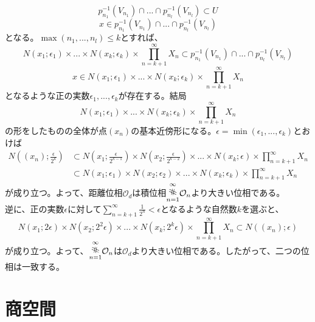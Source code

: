 \documentclass{jsarticle}
\begin{document}
\[p_{n_1}^{-1}(V_{n_1})\cap...\cap p_{n_l}^{-1}(V_{n_l})\subset U\]
\[x\in p_{n_1}^{-1}(V_{n_1})\cap...\cap p_{n_l}^{-1}(V_{n_l})\]
となる。$\max(n_1,...,n_l)\leq k$とすれば、
\[N(x_1;\epsilon_1)\times...\times N(x_k;\epsilon_k)\times\prod_{n=k+1}^{\infty}X_n\subset p_{n_1}^{-1}(V_{n_1})\cap...\cap p_{n_l}^{-1}(V_{n_l})\]
\[x\in N(x_1;\epsilon_1)\times...\times N(x_k;\epsilon_k)\times\prod_{n=k+1}^{\infty}X_n\]
となるような正の実数$\epsilon_1,...,\epsilon_k$が存在する。結局
\[N(x_1;\epsilon_1)\times...\times N(x_k;\epsilon_k)\times\prod_{n=k+1}^{\infty}X_n\]
の形をしたものの全体が点$(x_n)$の基本近傍形になる。$\epsilon=\min(\epsilon_1,...,\epsilon_k)$とおけば
\begin{align*}
N((x_n);\frac{\epsilon}{2^k})&\subset N(x_1;\frac{\epsilon}{2^{k-1}})\times N(x_2;\frac{\epsilon}{2^{k-2}})\times...\times N(x_k;\epsilon)\times\prod_{n=k+1}^{\infty}X_n\\
&\subset N(x_1;\epsilon_1)\times N(x_2;\epsilon_2)\times...\times N(x_k;\epsilon_k)\times\prod_{n=k+1}^{\infty}X_n
\end{align*}
が成り立つ。よって、距離位相$\mathcal{O}_d$は積位相$\underset{n=1}{\overset{\infty}{\rotatebox{80}{\#}}}\mathcal{O}_n$より大きい位相である。\\
逆に、正の実数$\epsilon$に対して$\sum_{n=k+1}^{\infty}\frac{1}{2^n}<\epsilon$となるような自然数$k$を選ぶと、
\[N(x_1;2\epsilon)\times N(x_2;2^2\epsilon)\times...\times N(x_k;2^k\epsilon)\times\prod_{n=k+1}^{\infty}X_n\subset N((x_n);\epsilon)\]
が成り立つ。よって、$\underset{n=1}{\overset{\infty}{\rotatebox{80}{\#}}}\mathcal{O}_n$は$\mathcal{O}_d$より大きい位相である。したがって、二つの位相は一致する。


\section{商空間}
\subsection{}
\end{document}
